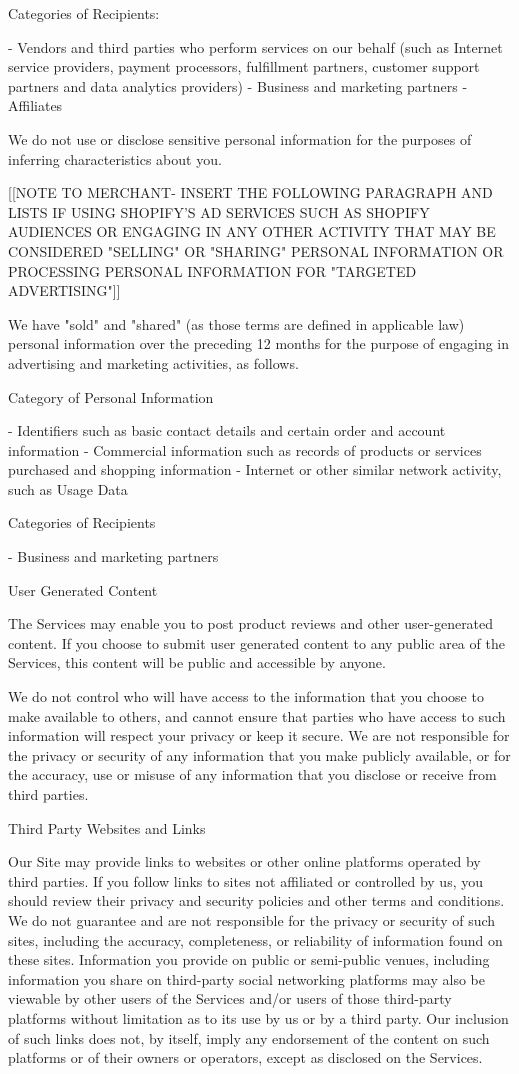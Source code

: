 \documentclass[conference]{IEEEtran}
\begin{document}
Categories of Recipients:

- Vendors and third parties who perform services on our behalf (such as Internet service providers, payment processors, fulfillment partners, customer support partners and data analytics providers)
- Business and marketing partners
- Affiliates

We do not use or disclose sensitive personal information for the purposes of inferring characteristics about you.

[[NOTE TO MERCHANT- INSERT THE FOLLOWING PARAGRAPH AND LISTS IF USING SHOPIFY'S AD SERVICES SUCH AS SHOPIFY AUDIENCES OR ENGAGING IN ANY OTHER ACTIVITY THAT MAY BE CONSIDERED "SELLING" OR "SHARING" PERSONAL INFORMATION OR PROCESSING PERSONAL INFORMATION FOR "TARGETED ADVERTISING"]]

We have "sold" and "shared" (as those terms are defined in applicable law) personal information over the preceding 12 months for the purpose of engaging in advertising and marketing activities, as follows.

Category of Personal Information

- Identifiers such as basic contact details and certain order and account information
- Commercial information such as records of products or services purchased and shopping information
- Internet or other similar network activity, such as Usage Data

Categories of Recipients

- Business and marketing partners

User Generated Content

The Services may enable you to post product reviews and other user-generated content. If you choose to submit user generated content to any public area of the Services, this content will be public and accessible by anyone.

We do not control who will have access to the information that you choose to make available to others, and cannot ensure that parties who have access to such information will respect your privacy or keep it secure. We are not responsible for the privacy or security of any information that you make publicly available, or for the accuracy, use or misuse of any information that you disclose or receive from third parties.

Third Party Websites and Links

Our Site may provide links to websites or other online platforms operated by third parties. If you follow links to sites not affiliated or controlled by us, you should review their privacy and security policies and other terms and conditions. We do not guarantee and are not responsible for the privacy or security of such sites, including the accuracy, completeness, or reliability of information found on these sites. Information you provide on public or semi-public venues, including information you share on third-party social networking platforms may also be viewable by other users of the Services and/or users of those third-party platforms without limitation as to its use by us or by a third party. Our inclusion of such links does not, by itself, imply any endorsement of the content on such platforms or of their owners or operators, except as disclosed on the Services.
\end{document}
